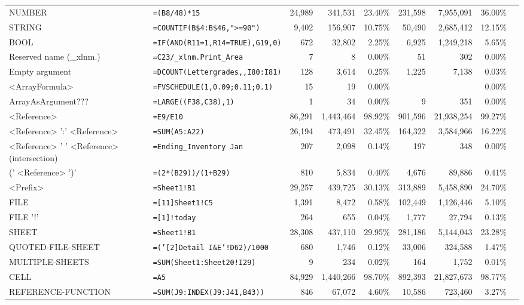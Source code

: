 \documentclass[conference]{IEEEtran}
\begin{document}
\begin{table*}
\begin{tabular}{llrrrrrrr}
			NUMBER & \texttt{=(B8/48)*15} & 24,989 & 341,531 & 23.40\% & 231,598 & 7,955,091 & 36.00\%\\
			STRING & \texttt{=COUNTIF(B\$4:B\$46,">=90")} & 9,402 & 156,907 & 10.75\% & 50,490 & 2,685,412 & 12.15\%\\
			BOOL & \texttt{=IF(AND(R11=1,R14=TRUE),G19,0)} & 672 & 32,802 & 2.25\% & 6,925 & 1,249,218 & 5.65\%\\
			Reserved name (_xlnm.) & \texttt{=C23/_xlnm.Print_Area} & 7 & 8 & 0.00\% & 51 & 302 & 0.00\%\\
			Empty argument & \texttt{=DCOUNT(Lettergrades,,I80:I81)} & 128 & 3,614 & 0.25\% & 1,225 & 7,138 & 0.03\%\\
			<ArrayFormula> & \texttt{=FVSCHEDULE(1,{0.09;0.11;0.1})} & 15 & 19 & 0.00\% &  &  & 0.00\%\\
			ArrayAsArgument??? & \texttt{=LARGE((F38,C38),1)} & 1 & 34 & 0.00\% & 9 & 351 & 0.00\%\\
			\hline
			<Reference> & \texttt{=E9/E10} & 86,291 & 1,443,464 & 98.92\% & 901,596 & 21,938,254 & 99.27\%\\
			<Reference> ':' <Reference> & \texttt{=SUM(A5:A22)} & 26,194 & 473,491 & 32.45\% & 164,322 & 3,584,966 & 16.22\%\\
			<Reference> ' ' <Reference> (intersection) & \texttt{=Ending_Inventory Jan} & 207 & 2,098 & 0.14\% & 197 & 348 & 0.00\%\\
			(' <Reference> ')' & \texttt{=(2*(B29))/(1+B29)} & 810 & 5,834 & 0.40\% & 4,676 & 89,886 & 0.41\%\\
			<Prefix> & \texttt{=Sheet1!B1} & 29,257 & 439,725 & 30.13\% & 313,889 & 5,458,890 & 24.70\%\\
			FILE & \texttt{=[11]Sheet1!C5} & 1,391 & 8,472 & 0.58\% & 102,449 & 1,126,446 & 5.10\%\\
			FILE '!' & \texttt{=[1]!today} & 264 & 655 & 0.04\% & 1,777 & 27,794 & 0.13\%\\
			SHEET & \texttt{=Sheet1!B1} & 28,308 & 437,110 & 29.95\% & 281,186 & 5,144,043 & 23.28\%\\
			QUOTED-FILE-SHEET & \texttt{=('[2]Detail I\&E'!D62)/1000} & 680 & 1,746 & 0.12\% & 33,006 & 324,588 & 1.47\%\\
			MULTIPLE-SHEETS & \texttt{=SUM(Sheet1:Sheet20!I29)} & 9 & 234 & 0.02\% & 164 & 1,752 & 0.01\%\\
			CELL & \texttt{=A5} & 84,929 & 1,440,266 & 98.70\% & 892,393 & 21,827,673 & 98.77\%\\
			REFERENCE-FUNCTION & \texttt{=SUM(J9:INDEX(J9:J41,B43))} & 846 & 67,072 & 4.60\% & 10,586 & 723,460 & 3.27\%\\

\end{tabular}
\end{table*}
\end{document}
